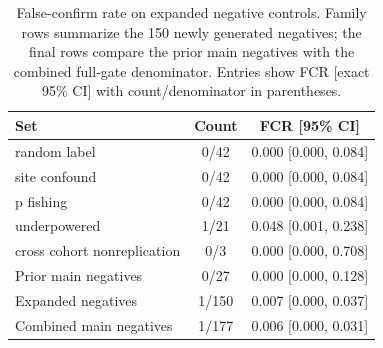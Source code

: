 \begin{table}[t]
\centering
\caption{False-confirm rate on expanded negative controls. Family rows summarize the 150 newly generated negatives; the final rows compare the prior main negatives with the combined full-gate denominator. Entries show FCR [exact 95\% CI] with count/denominator in parentheses.}
\label{tab:negatives}
\scriptsize
\setlength{\tabcolsep}{3.5pt}
\begin{tabular}{@{}p{}cc@{}}
\toprule
Set & Count & FCR [95\% CI] \\
\midrule
random label & 0/42 & 0.000 [0.000, 0.084] \\
site confound & 0/42 & 0.000 [0.000, 0.084] \\
p fishing & 0/42 & 0.000 [0.000, 0.084] \\
underpowered & 1/21 & 0.048 [0.001, 0.238] \\
cross cohort nonreplication & 0/3 & 0.000 [0.000, 0.708] \\
\midrule
Prior main negatives & 0/27 & 0.000 [0.000, 0.128] \\
Expanded negatives & 1/150 & 0.007 [0.000, 0.037] \\
Combined main negatives & 1/177 & 0.006 [0.000, 0.031] \\
\bottomrule
\end{tabular}
\end{table}

